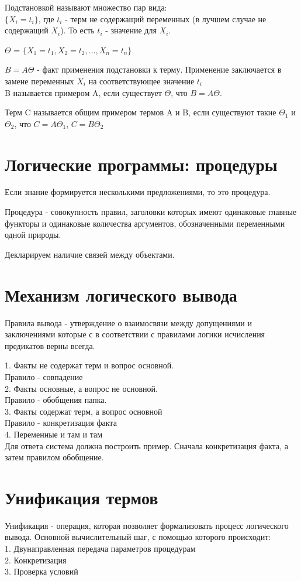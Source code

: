 Подстановкой называют множество пар вида:\\
$\{X_i = t_i\}$, где $t_i$ - терм не содержащий переменных (в лучшем случае не содержащий $X_i$). То есть $t_i$ - значение для $X_i$. 

$\Theta$ = $\{X_1 = t_1, X_2 = t_2, ..., X_n = t_n\}$

$B = A\Theta$ - факт применения подстановки к терму. Применение заключается в замене переменных $X_i$ на соответствующее значение $t_i$\\

B называется примером A, если существует $\Theta$, что $B = A\Theta$. 

Терм C называется общим примером термов A и B, если существуют такие $\Theta_1$ и $\Theta_2$, что $C = A\Theta_1$, $C = B\Theta_2$\\

\section{Логические программы: процедуры}
Если знание формируется несколькими предложениями, то это процедура.

Процедура - совокупность правил, заголовки которых имеют одинаковые главные функторы и одинаковые количества аргументов, обозначенными переменными одной природы.

Декларируем наличие связей между объектами.

\section{Механизм логического вывода}
Правила вывода - утверждение о взаимосвязи между допущениями и заключениями которые с в соответствии с правилами логики исчисления предикатов верны всегда.

1. Факты не содержат терм и вопрос основной.\\
Правило - совпадение\\
2. Факты основные, а вопрос не основной.\\
Правило - обобщения папка.\\
3. Факты содержат терм, а вопрос основной\\
Правило - конкретизация факта\\
4. Переменные и там и там\\
Для ответа система должна построить пример. Сначала конкретизация факта, а затем правилом обобщение. 

\section{Унификация термов}
Унификация - операция, которая позволяет формализовать процесс логического вывода. Основной вычислительный шаг, с помощью которого происходит:\\
1. Двунаправленная передача параметров процедурам\\
2. Конкретизация\\
3. Проверка условий\\

